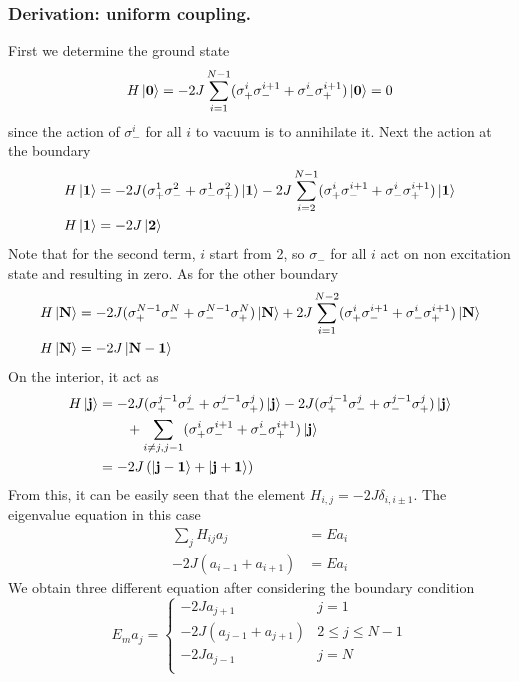 \documentclass[../../../main.tex]{subfiles}
\begin{document}
\subsubsection{Derivation: uniform coupling.}
First we determine the ground state
\begin{equation*}
    H \ket{\mathbf{0}} =  - 2J \sum_{i=1 } ^{N-1} (\sigma_{+} ^{i} \sigma_- ^{i+1} + \sigma_{-} ^{i} \sigma_+ ^{i+1}) \ket{\mathbf{0}} = 0
\end{equation*}
since the action of $\sigma_- ^{i}$ for all $i$ to vacuum is to annihilate it.
Next the action at the boundary
\begin{align*}
    H \ket{\mathbf{1}} & =  - 2J (\sigma_{+} ^{1} \sigma_- ^{2} + \sigma_{-} ^{1} \sigma_+ ^{2}) \ket{\mathbf{1}} - 2J\sum_{i=2 } ^{N-1} (\sigma_{+} ^{i} \sigma_- ^{i+1} + \sigma_{-} ^{i} \sigma_+ ^{i+1}) \ket{\mathbf{1}} \\
    H \ket{\mathbf{1}} & = - 2J \ket{\mathbf{2}}
\end{align*}
Note that for the second term, $i$ start from 2, so $\sigma_-$ for all $i $ act on non excitation state and resulting in zero.
As for the other boundary
\begin{align*}
    H \ket{\mathbf{N}} & =  - 2J (\sigma_{+} ^{N-1} \sigma_- ^{N} + \sigma_{-} ^{N-1} \sigma_+ ^{N}) \ket{\mathbf{N}} + 2J\sum_{i=1 } ^{N-2} (\sigma_{+} ^{i} \sigma_- ^{i+1} + \sigma_{-} ^{i} \sigma_+ ^{i+1}) \ket{\mathbf{N}} \\
    H \ket{\mathbf{N}} & = -2J \ket{\mathbf{N-1}}
\end{align*}
On the interior, it act as
\begin{align*}
    H \ket{\mathbf{j}} & =  - 2J (\sigma_{+} ^{j-1} \sigma_- ^{j} + \sigma_{-} ^{j-1} \sigma_+ ^{j}) \ket{\mathbf{j}}  - 2J (\sigma_{+} ^{j-1} \sigma_- ^{j} + \sigma_{-} ^{j-1} \sigma_+ ^{j}) \ket{\mathbf{j}} \\
                       & \qquad+ \sum_{i\neq j,j-1 }  (\sigma_{+} ^{i} \sigma_- ^{i+1} + \sigma_{-} ^{i} \sigma_+ ^{i+1}) \ket{\mathbf{j}}                                                                       \\
                       & = - 2J \left( \ket{\mathbf{j-1}} + \ket{\mathbf{j+1}} \right)
\end{align*}
From this, it can be easily seen that the element $H_{i,j} = -2J\delta_{i,i\pm1}$.
The eigenvalue equation in this case
\begin{align*}
    \sum_j H_{ij}a_j
                         & =
    Ea_i                           \\
    -2J(a_{i-1}+a_{i+1}) & =  Ea_i
\end{align*}
We obtain three different equation after considering the boundary condition
\begin{equation*}
    E_m a_j = \begin{cases}
        - 2J a_{j+1}         & j= 1              \\
        -2J(a_{j-1}+a_{j+1}) & 2 \leq j \leq N-1 \\
        - 2J a_{j-1}         & j= N              \\
    \end{cases}
\end{equation*}
\end{document}

